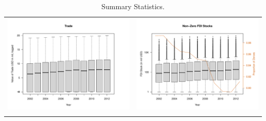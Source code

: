 \documentclass[reqno,onecolumn,letterpaper,12pt]{article}
\begin{document}
\begin{longtable}{c@{\hskip -.4cm}c}
\includegraphics[height=.2\textheight, clip=true, trim=1cm 1cm 0cm 1.6cm]{draft_figures/descriptive_plots/TradeV.pdf}    &
\includegraphics[height=.2\textheight, clip=true, trim=1cm 1cm 0cm 1.6cm]{draft_figures/descriptive_plots/fdi_stock.pdf}   \\

\caption{\label{fig:sum_stats} Summary Statistics.}
\end{longtable}
\end{document}
